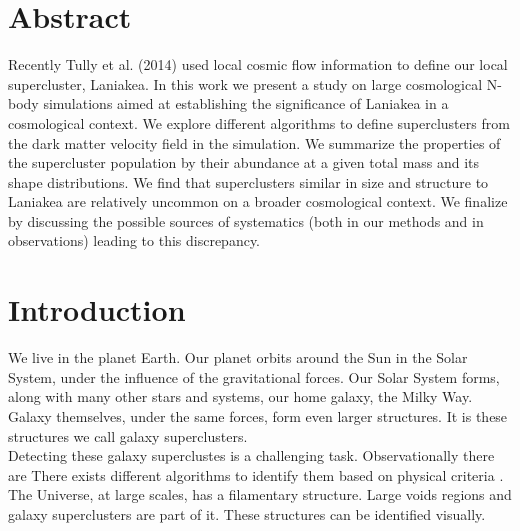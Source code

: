 \documentclass[12pt]{article}
\begin{document}
\section{Abstract}
Recently Tully et al. (2014)
 \cite{tully_laniakea_2014} used local cosmic flow
 information to define our local supercluster,
  Laniakea. 
In this work we present a study on large
 cosmological N-body
simulations aimed at establishing the significance
 of Laniakea in a
cosmological context.
We explore different algorithms to define
 superclusters from the dark
matter velocity field in the simulation. 
We summarize the properties of the supercluster
 population by their
abundance at a given total mass and its shape
 distributions.
We find that superclusters similar in size and
 structure to Laniakea are
relatively uncommon on a broader cosmological
 context.
We finalize by discussing the possible sources of
 systematics (both in
our methods and in observations) leading to this
 discrepancy.
\newpage
\tableofcontents
\newpage

\section{Introduction}

We live in the planet Earth. Our planet orbits
 around the Sun in the Solar System, under the
  influence of the gravitational forces. Our Solar
   System forms, along with many other stars and
    systems, our home galaxy, the Milky
    Way. Galaxy themselves, under the
  same forces, form even larger structures. It is
   these structures we call galaxy superclusters. \\
   

Detecting these galaxy superclustes is a challenging task. Observationally there are  There exists
    different algorithms to identify them based on
     physical criteria \cite{gott_iii_map_2005}. The Universe, at large scales, has a filamentary
 structure. Large voids regions and galaxy
  superclusters are part of it. These structures
   can
   be identified visually.  
\\
\end{document}
